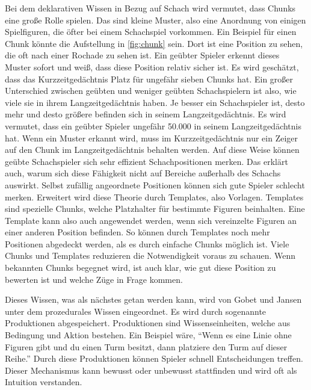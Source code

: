 Bei dem deklarativen Wissen in Bezug auf Schach wird vermutet, dass Chunks eine große Rolle spielen. Das sind kleine Muster, also eine Anordnung von einigen Spielfiguren, die öfter bei einem Schachspiel vorkommen. Ein Beispiel für einen Chunk könnte die Aufstellung in \autoref{fig:chunk} sein. Dort ist eine Position zu sehen, die oft nach einer Rochade zu sehen ist. Ein geübter Spieler erkennt dieses Muster sofort und weiß, dass diese Position relativ sicher ist. Es wird geschätzt, dass das Kurzzeitgedächtnis Platz für ungefähr sieben Chunks hat. Ein großer Unterschied zwischen geübten und weniger geübten Schachspielern ist also, wie viele sie in ihrem Langzeitgedächtnis haben. Je besser ein Schachspieler ist, desto mehr und desto größere befinden sich in seinem Langzeitgedächtnis. Es wird vermutet, dass ein geübter Spieler ungefähr 50.000 in seinem Langzeitgedächtnis hat. Wenn ein Muster erkannt wird, muss im Kurzzeitgedächtnis nur ein Zeiger auf den Chunk im Langzeitgedächtnis behalten werden. Auf diese Weise können geübte Schachspieler sich sehr effizient Schachpositionen merken. Das erklärt auch, warum sich diese Fähigkeit nicht auf Bereiche außerhalb des Schachs auswirkt. Selbst zufällig angeordnete Positionen können sich gute Spieler schlecht merken. Erweitert wird diese Theorie durch Templates, also Vorlagen. Templates sind spezielle Chunks, welche Platzhalter für bestimmte Figuren beinhalten. Eine Template kann also auch angewendet werden, wenn sich vereinzelte Figuren an einer anderen Position befinden. So können durch Templates noch mehr Positionen abgedeckt werden, als es durch einfache Chunks möglich ist. Viele Chunks und Templates reduzieren die Notwendigkeit voraus zu schauen. Wenn bekannten Chunks begegnet wird, ist auch klar, wie gut diese Position zu bewerten ist und welche Züge in Frage kommen.
\cite{gobet_templates_1996}

Dieses Wissen, was als nächstes getan werden kann, wird von Gobet und Jansen unter dem prozedurales Wissen eingeordnet. Es wird durch sogenannte Produktionen abgespeichert. Produktionen sind Wissenseinheiten, welche aus Bedingung und Aktion bestehen. Ein Beispiel wäre, \enquote{Wenn es eine Linie ohne Figuren gibt und du einen Turm besitzt, dann platziere den Turm auf dieser Reihe.} Durch diese Produktionen können Spieler schnell Entscheidungen treffen. Dieser Mechanismus kann bewusst oder unbewusst stattfinden und wird oft als Intuition verstanden.
\cite{gobet_training_2006}


